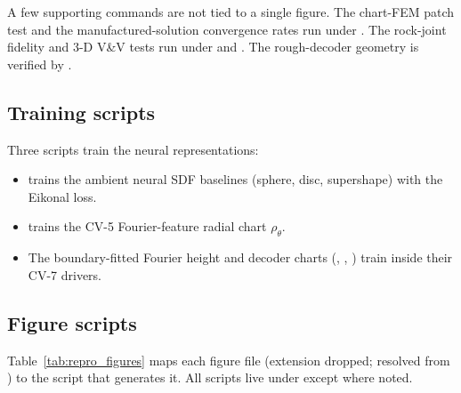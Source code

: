\noindent A few supporting commands are not tied to a single figure. The chart-FEM patch test
and the manufactured-solution convergence rates run under
. The rock-joint fidelity and 3-D V\&V tests run under
 and .
The rough-decoder geometry is verified by .

\subsection{Training scripts}

Three scripts train the neural representations:

\begin{itemize}
\item {} trains the ambient neural SDF baselines
      (sphere, disc, supershape) with the Eikonal loss.
\item {} trains the CV-5 Fourier-feature radial chart
      $\rho_\theta$.
\item The boundary-fitted Fourier height and decoder charts
      (, ,
      ) train inside their CV-7 drivers.
\end{itemize}

\subsection{Figure scripts}

Table~\ref{tab:repro_figures} maps each figure file (extension dropped; resolved from
) to the script that generates it. All scripts live under
 except where noted.

